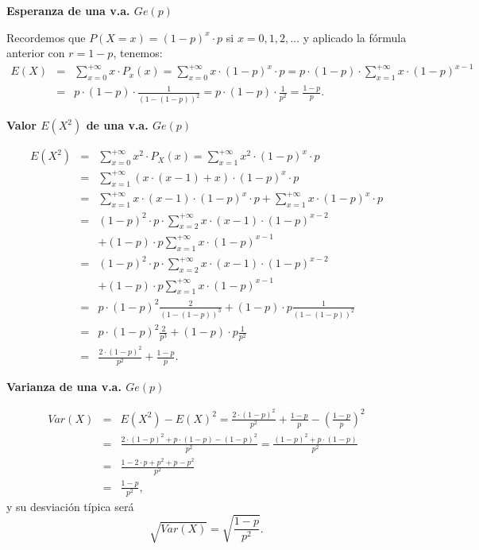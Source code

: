 \documentclass[]{book}
\begin{document}
\textbf{Esperanza de una v.a. \(Ge(p)\)}

Recordemos que \(P(X=x)=(1-p)^x\cdot p\) si \(x=0,1,2,\ldots\) y aplicado la fórmula anterior con \(r=1-p\), tenemos:
\[
\begin{array}{rll}
E(X)&=&\sum_{x=0}^{+\infty} x\cdot P_x(x)=\sum_{x=0}^{+\infty} x\cdot (1-p)^x\cdot p=
p\cdot (1-p) \cdot \sum_{x=1}^{+\infty} x\cdot (1-p)^{x-1}\\
&=& p\cdot (1-p)\cdot \frac{1}{(1-(1-p))^2}=p\cdot (1-p)\cdot \frac{1}{p^2}=\frac{1-p}{p}.
\end{array}
\]

\textbf{Valor \(E(X^2)\) de una v.a. \(Ge(p)\)}

\[
\begin{array}{rll}
E(X^2)&=&\sum_{x=0}^{+\infty} x^2\cdot P_X(x)=\sum_{x=1}^{+\infty} x^2\cdot (1-p)^x\cdot p\\
&=& 
\sum_{x=1}^{+\infty} (x\cdot (x-1)+x)\cdot (1-p)^{x}\cdot p\\
&=&
\sum_{x=1}^{+\infty} x\cdot (x-1)\cdot (1-p)^{x}\cdot p+\sum_{x=1}^{+\infty} x \cdot (1-p)^{x}\cdot p\\
&=&
(1-p)^{2}\cdot p\cdot \sum_{x=2}^{+\infty} x\cdot (x-1)\cdot (1-p)^{x-2}\\ 
& & +    (1-p)\cdot p\sum_{x=1}^{+\infty} x \cdot (1-p)^{x-1} 
\\  &=&
(1-p)^{2}\cdot p\cdot \sum_{x=2}^{+\infty} x\cdot (x-1)\cdot (1-p)^{x-2}\\ 
& &+   (1-p)\cdot p\sum_{x=1}^{+\infty} x \cdot (1-p)^{x-1}\\
&=&
p\cdot (1-p)^2 \frac{2}{(1-(1-p))^3}+  (1-p)\cdot p \frac{1}{(1-(1-p))^2}\\
&=&
p\cdot (1-p)^2 \frac{2}{p^3}+  (1-p)\cdot p \frac{1}{p^2}\\
&=&\frac{2\cdot (1-p)^2}{p^2}+\frac{1-p}{p}.
\end{array}
\]

\textbf{Varianza de una v.a. \(Ge(p)\)}

\[
\begin{array}{rll}
Var(X)&=&E(X^2)-E(X)^2=\frac{2\cdot (1-p)^2}{p^2}+\frac{1-p}{p}-\left(\frac{1-p}{p}\right)^2\\
&=&
\frac{2\cdot (1-p)^2+p\cdot(1-p)-(1-p)^2}{p^2}=\frac{(1-p)^2+p\cdot(1-p)}{p^2}\\
&=&
\frac{1-2\cdot p + p^2+p-p^2}{p^2}\\
&=& \frac{1-p}{p^2},
\end{array}
\]
y su desviación típica será
\[\sqrt{Var(X)}=\sqrt{\frac{1-p}{p^2}}.\]
\end{document}
